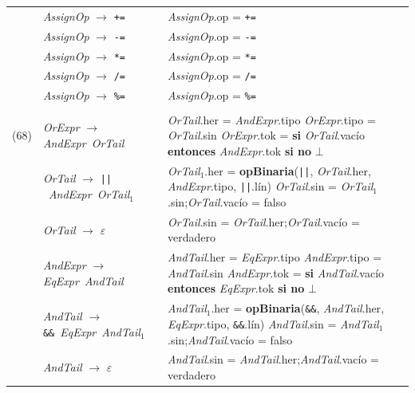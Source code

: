 \documentclass[11pt]{article}
\newcommand{\NT}[1]{\textcolor{ntcolor}{\textit{#1}}}            %
\newcommand{\T}[1]{\textcolor{tcolor}{\texttt{#1}}}              %
\newcommand{\A}[2]{\NT{#1}.\textsf{#2}}                          %
\newcommand{\Ax}[3]{\NT{#1}$_{#2}$.\textsf{#3}}                  %
\newcommand{\fn}[1]{\textsf{\textbf{#1}}}                        %
\newcommand{\kw}[1]{\textbf{#1}}                                 %
\begin{document}
{\begin{longtable}{@{}r@{\hspace{6pt}}>{\raggedright\arraybackslash}p{5.6cm}@{\hspace{8pt}}>{\raggedright\arraybackslash}p{9.9cm}@{}}
\addlinespace[2pt]
{(63)} & \NT{AssignOp} $\rightarrow$ \T{+=} & \A{AssignOp}{op} = \T{+=} \\
\addlinespace[2pt]
{(64)} & \NT{AssignOp} $\rightarrow$ \T{-=} & \A{AssignOp}{op} = \T{-=} \\
\addlinespace[2pt]
{(65)} & \NT{AssignOp} $\rightarrow$ \T{*=} & \A{AssignOp}{op} = \T{*=} \\
\addlinespace[2pt]
{(66)} & \NT{AssignOp} $\rightarrow$ \T{/=} & \A{AssignOp}{op} = \T{/=} \\
\addlinespace[2pt]
{(67)} & \NT{AssignOp} $\rightarrow$ \T{\%=} & \A{AssignOp}{op} = \T{\%=} \\
\addlinespace[2pt]
\midrule
\multicolumn{3}{l}{\textbf{Expresiones binarias}} \\ \midrule
{(68)} & \NT{OrExpr} $\rightarrow$ \NT{AndExpr}\ \NT{OrTail} & \A{OrTail}{her} = \A{AndExpr}{tipo} \newline \A{OrExpr}{tipo} = \A{OrTail}{sin} \newline \A{OrExpr}{tok} = \kw{si} \A{OrTail}{vacío} \kw{entonces} \A{AndExpr}{tok} \kw{si no} $\bot$ \\
\addlinespace[2pt]
{(69)} & \NT{OrTail} $\rightarrow$ \T{||}\ \NT{AndExpr}\ \NT{OrTail}$_{1}$ & \Ax{OrTail}{1}{her} = \fn{opBinaria}(\T{||}, \A{OrTail}{her}, \A{AndExpr}{tipo}, \T{||}.\textsf{lín}) \newline \A{OrTail}{sin} = \Ax{OrTail}{1}{sin};\quad \A{OrTail}{vacío} = \textsf{falso} \\
\addlinespace[2pt]
{(70)} & \NT{OrTail} $\rightarrow$ $\varepsilon$ & \A{OrTail}{sin} = \A{OrTail}{her};\quad \A{OrTail}{vacío} = \textsf{verdadero} \\
\addlinespace[2pt]
{(71)} & \NT{AndExpr} $\rightarrow$ \NT{EqExpr}\ \NT{AndTail} & \A{AndTail}{her} = \A{EqExpr}{tipo} \newline \A{AndExpr}{tipo} = \A{AndTail}{sin} \newline \A{AndExpr}{tok} = \kw{si} \A{AndTail}{vacío} \kw{entonces} \A{EqExpr}{tok} \kw{si no} $\bot$ \\
\addlinespace[2pt]
{(72)} & \NT{AndTail} $\rightarrow$ \T{\&\&}\ \NT{EqExpr}\ \NT{AndTail}$_{1}$ & \Ax{AndTail}{1}{her} = \fn{opBinaria}(\T{\&\&}, \A{AndTail}{her}, \A{EqExpr}{tipo}, \T{\&\&}.\textsf{lín}) \newline \A{AndTail}{sin} = \Ax{AndTail}{1}{sin};\quad \A{AndTail}{vacío} = \textsf{falso} \\
\addlinespace[2pt]
{(73)} & \NT{AndTail} $\rightarrow$ $\varepsilon$ & \A{AndTail}{sin} = \A{AndTail}{her};\quad \A{AndTail}{vacío} = \textsf{verdadero} \\

\end{longtable}}
\end{document}
